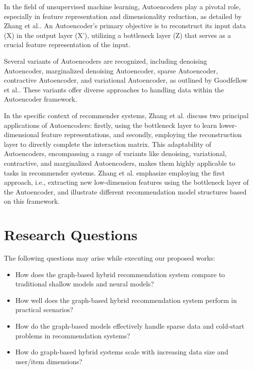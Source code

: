In the field of unsupervised machine learning, Autoencoders play a pivotal role, especially in feature representation and dimensionality reduction, as detailed by Zhang et al.\cite{zhang2019deep}. An Autoencoder's primary objective is to reconstruct its input data (X) in the output layer (X'), utilizing a bottleneck layer (Z) that serves as a crucial feature representation of the input.

Several variants of Autoencoders are recognized, including denoising Autoencoder, marginalized denoising Autoencoder, sparse Autoencoder, contractive Autoencoder, and variational Autoencoder, as outlined by Goodfellow et al.\cite{graves2013speech}. These variants offer diverse approaches to handling data within the Autoencoder framework.

In the specific context of recommender systems, Zhang et al.\cite{zhang2019deep} discuss two principal applications of Autoencoders: firstly, using the bottleneck layer to learn lower-dimensional feature representations, and secondly, employing the reconstruction layer to directly complete the interaction matrix. This adaptability of Autoencoders, encompassing a range of variants like denoising, variational, contractive, and marginalized Autoencoders, makes them highly applicable to tasks in recommender systems. Zhang et al.\cite{zhang2019deep} emphasize employing the first approach, i.e., extracting new low-dimension features using the bottleneck layer of the Autoencoder, and illustrate different recommendation model structures based on this framework.



\section{Research Questions}
The following questions may arise while executing our proposed works:
\begin{itemize}
    \item How does the graph-based hybrid recommendation system compare to traditional shallow models and neural models?
    \item How well does the graph-based hybrid recommendation system perform in practical scenarios?
    \item How do the graph-based models effectively handle sparse data and cold-start problems in recommendation systems?
    \item How do graph-based hybrid systems scale with increasing data size and user/item dimensions?
\end{itemize}
    

